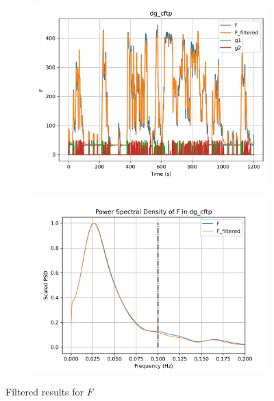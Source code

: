 \begin{figure}[H]

\begin{minipage}{0.49\textwidth}
        \begin{figure}[H]
                \centering
                \includegraphics[width = \textwidth]{./figs/tst_filt/dg_cftp/F.png}
        \end{figure}
\end{minipage}
\begin{minipage}{0.49\textwidth}
        \begin{figure}[H]
                \centering
                \includegraphics[width = \textwidth]{./figs/tst_filt/dg_cftp/F_psd.png}
        \end{figure}
\end{minipage}
\caption{Filtered results for $F$}

\end{figure}


